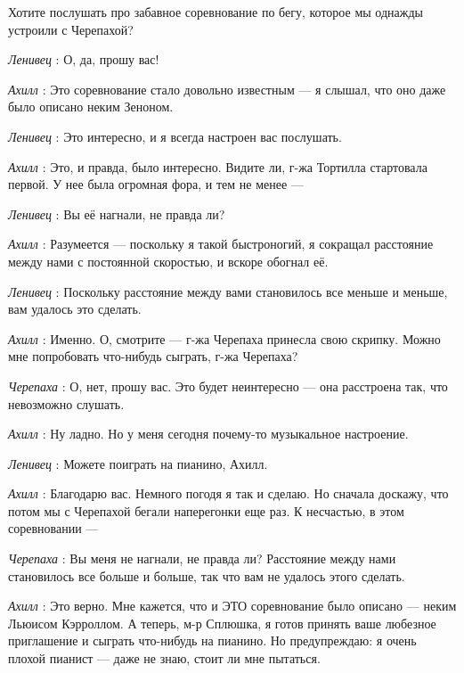 \documentclass[../main.tex]{subfiles}
\begin{document}


\begin{dialogue}

 Хотите послушать про забавное соревнование по бегу, которое мы однажды устроили с Черепахой?

\emph{Ленивец} : О, да, прошу вас!

\emph{Ахилл} : Это соревнование стало довольно известным --- я слышал, что оно даже было описано неким Зеноном.

\emph{Ленивец} : Это интересно, и я всегда настроен вас послушать.

\emph{Ахилл} : Это, и правда, было интересно. Видите ли, г-жа Тортилла стартовала первой. У нее была огромная фора, и тем не менее ---

\emph{Ленивец} : Вы её нагнали, не правда ли?

\emph{Ахилл} : Разумеется --- поскольку я такой быстроногий, я сокращал расстояние между нами с постоянной скоростью, и вскоре обогнал её.

\emph{Ленивец} : Поскольку расстояние между вами становилось все меньше и меньше, вам удалось это сделать.

\emph{Ахилл} : Именно. О, смотрите --- г-жа Черепаха принесла свою скрипку. Можно мне попробовать что-нибудь сыграть, г-жа Черепаха?

\emph{Черепаха} : О, нет, прошу вас. Это будет неинтересно --- она расстроена так, что невозможно слушать.

\emph{Ахилл} : Ну ладно. Но у меня сегодня почему-то музыкальное настроение.

\emph{Ленивец} : Можете поиграть на пианино, Ахилл.

\emph{Ахилл} : Благодарю вас. Немного погодя я так и сделаю. Но сначала доскажу, что потом мы с Черепахой бегали наперегонки еще раз. К несчастью, в этом соревновании ---

\emph{Черепаха} : Вы меня не нагнали, не правда ли? Расстояние между нами становилось все больше и больше, так что вам не удалось этого сделать.

\emph{Ахилл} : Это верно. Мне кажется, что и ЭТО соревнование было описано --- неким Льюисом Кэрроллом. А теперь, м-р Сплюшка, я готов принять ваше любезное приглашение и сыграть что-нибудь на пианино. Но предупреждаю: я очень плохой пианист --- даже не знаю, стоит ли мне пытаться.


\end{dialogue}
\end{document}
